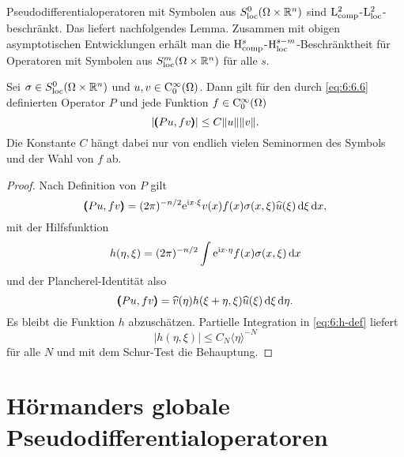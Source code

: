 Pseudodifferentialoperatoren mit Symbolen aus $S^0_{\rm loc}(\Omega\times\mathbb R^n)$ sind $\mathrm L^2_{\rm comp}$-$\mathrm L^2_{\rm loc}$-beschränkt. Das liefert nachfolgendes Lemma. Zusammen mit obigen asymptotischen Entwicklungen erhält man die $\mathrm H^s_{\rm comp}$-$\mathrm H^{s-m}_{\rm loc}$-Beschränktheit für Operatoren mit Symbolen aus $S^m_{\rm loc}(\Omega\times\mathbb R^n)$ für alle $s$.
\begin{lem}
Sei $\sigma\in S^0_{\rm loc}(\Omega\times\mathbb R^n)$ und $u,v\in\mathrm C_0^\infty(\Omega)$. Dann gilt für den durch \eqref{eq:6:6.6} definierten Operator $P$
und jede Funktion $f\in\mathrm C_0^\infty(\Omega)$
\begin{equation}
   | \pmb(Pu,f v\pmb) | \le C \|u\|\|v\|.
\end{equation}
Die Konstante $C$ hängt dabei nur von endlich vielen Seminormen des Symbols und der Wahl von $f$ ab.
\end{lem}
\begin{proof}
Nach Definition von $P$ gilt
\begin{equation}
   \pmb(Pu,fv\pmb) = (2\pi)^{-n/2} \relax \mathrm e^{\mathrm i x\cdot \xi} v(x) f(x) \sigma(x,\xi) \widehat u(\xi)\,\mathrm d\xi\,\mathrm d x,
\end{equation}
mit der Hilfsfunktion
\begin{equation}\label{eq:6:h-def}
  h(\eta,\xi) = (2\pi)^{-n/2} \int \mathrm e^{\mathrm i x\cdot\eta} f(x) \sigma(x,\xi) \,\mathrm d x
\end{equation}
und der Plancherel-Identität also
\begin{equation}
   \pmb(Pu,fv\pmb) = \relax \widehat v(\eta) h(\xi+\eta,\xi) \widehat u(\xi)\,\mathrm d\xi\,\mathrm d\eta.
\end{equation}
Es bleibt die Funktion $h$ abzuschätzen. Partielle Integration in \eqref{eq:6:h-def} liefert
\begin{equation}
   |h(\eta,\xi)|  \le C_N \langle\eta\rangle^{-N}
\end{equation}
für alle $N$ und mit dem Schur-Test die Behauptung.
\end{proof}

\section{Hörmanders globale Pseudodifferentialoperatoren}

